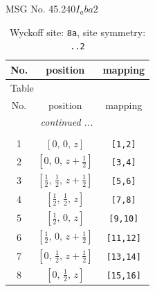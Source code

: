 \documentclass[fleqn,8pt]{jsarticle}
\begin{document}
\setcounter{MaxMatrixCols}{32}

\renewcommand{\tablename}{Table~}
\renewcommand{\figurename}{Figure~}
\begin{center}
\LARGE
MSG No. 45.240\quad$I_{a}ba2$
\end{center}
\renewcommand{\arraystretch}{1.2}
\begin{longtable}{ccc}
\caption{Wyckoff site: {\tt 8a}, site symmetry: {\tt ..2}}
 \\
 \hline \hline
No. & position & mapping \\ \hline \endfirsthead

\multicolumn{2}{l}{\tablename\ \thetable{}} \\
 \hline \hline
No. & position & mapping \\ \hline \endhead

 \hline \hline
\multicolumn{2}{r}{\footnotesize\it continued ...} \\ \endfoot

 \hline \hline
\multicolumn{2}{r}{} \\ \endlastfoot

1 & $\left[ 0,\, 0,\, z \right]$ & {\tt [1,2]} \\ \hline
2 & $\left[ 0,\, 0,\, z + \frac{1}{2} \right]$ & {\tt [3,4]} \\ \hline
3 & $\left[ \frac{1}{2},\, \frac{1}{2},\, z + \frac{1}{2} \right]$ & {\tt [5,6]} \\ \hline
4 & $\left[ \frac{1}{2},\, \frac{1}{2},\, z \right]$ & {\tt [7,8]} \\ \hline
5 & $\left[ \frac{1}{2},\, 0,\, z \right]$ & {\tt [9,10]} \\ \hline
6 & $\left[ \frac{1}{2},\, 0,\, z + \frac{1}{2} \right]$ & {\tt [11,12]} \\ \hline
7 & $\left[ 0,\, \frac{1}{2},\, z + \frac{1}{2} \right]$ & {\tt [13,14]} \\ \hline
8 & $\left[ 0,\, \frac{1}{2},\, z \right]$ & {\tt [15,16]} \\
\end{longtable}
\renewcommand{\arraystretch}{1.2}
\end{document}
